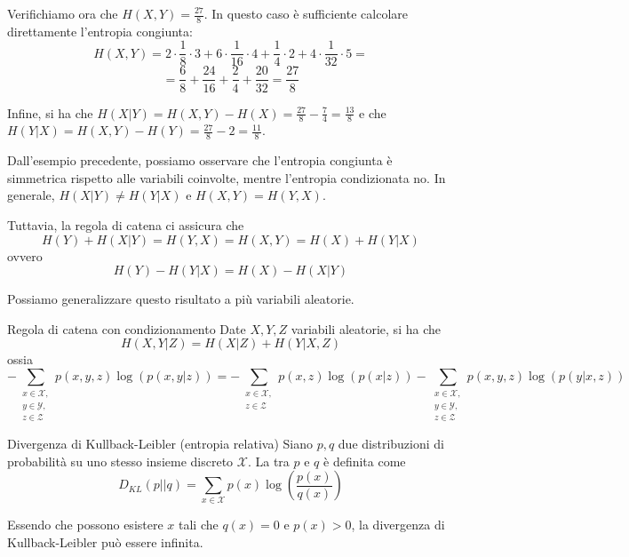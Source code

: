 \begin{example}{}
  Verifichiamo ora che \(H(X,Y) = \frac{27}{8}\).
  In questo caso è sufficiente calcolare direttamente l'entropia congiunta:
  \[H(X,Y) = 2\cdot\frac{1}{8}\cdot 3 + 6\cdot\frac{1}{16}\cdot 4 + \frac{1}{4}\cdot 2 + 4 \cdot \frac{1}{32}\cdot 5= \]
  \[= \frac{6}{8} + \frac{24}{16} + \frac{2}{4} + \frac{20}{32} = \frac{27}{8}\]
  

  Infine, si ha che \(H(X|Y) = H(X,Y)-H(X) = \frac{27}{8} - \frac{7}{4} = \frac{13}{8}\) e che \(H(Y|X) = H(X,Y)-H(Y) = \frac{27}{8} - 2 = \frac{11}{8}\).
\end{example}

Dall'esempio precedente, possiamo osservare che l'entropia congiunta è simmetrica rispetto alle variabili coinvolte, mentre l'entropia condizionata no.
In generale, \(H(X|Y) \neq H(Y|X)\) e \(H(X,Y) = H(Y,X)\).

Tuttavia, la regola di catena ci assicura che
\[H(Y)+H(X|Y)=H(Y,X)=H(X,Y) = H(X)+H(Y|X)\]
ovvero
\[H(Y) - H(Y|X) = H(X) - H(X|Y)\]

Possiamo generalizzare questo risultato a più variabili aleatorie.

\begin{proposition}{Regola di catena con condizionamento}
  Date \(X,Y,Z\) variabili aleatorie, si ha che
  \[H(X,Y|Z) = H(X|Z) + H(Y|X,Z)\]
  ossia
  \[- \sum_{\substack{x \in \mathcal{X},\\y\in\mathcal{Y},\\z \in \mathcal{Z}}} p(x,y,z) \log(p(x,y|z)) = -\sum_{\substack{x\in\mathcal{X},\\z\in\mathcal{Z}}} p(x,z)\log(p(x|z)) - \sum_{\substack{x \in \mathcal{X},\\y \in \mathcal{Y},\\z \in \mathcal{Z}}} p(x,y,z) \log(p(y|x,z))\]
\end{proposition}


\begin{definition}{Divergenza di Kullback-Leibler (entropia relativa)}
  Siano \(p,q\) due distribuzioni di probabilità su uno stesso insieme discreto \(\mathcal{X}\).
  La  tra \(p\) e \(q\) è definita come
  \[D_{KL}(p ||q) = \sum_{x \in \mathcal{X}} p(x) \log\left(\frac{p(x)}{q(x)}\right) \]
\end{definition}

\begin{note}{}
  Essendo che possono esistere \(x\) tali che \(q(x) = 0\) e \(p(x) > 0\), la divergenza di Kullback-Leibler può essere infinita.
\end{note}

